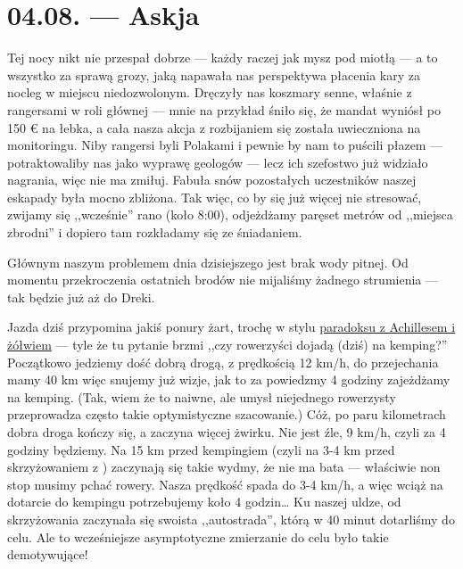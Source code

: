 \chapter*{04.08. --- Askja}

Tej nocy nikt nie przespał dobrze --- każdy raczej jak mysz pod miotłą --- a to wszystko za sprawą grozy, jaką napawała nas perspektywa płacenia kary za nocleg w miejscu niedozwolonym. Dręczyły nas koszmary senne, właśnie z rangersami w roli głównej --- mnie na przykład śniło się, że mandat wyniósł po 150 € na łebka, a cała nasza akcja z rozbijaniem się została uwieczniona na monitoringu. Niby rangersi byli Polakami i pewnie by nam to puścili płazem --- potraktowaliby nas jako wyprawę geologów --- lecz ich szefostwo już widziało nagrania, więc nie ma zmiłuj. Fabuła snów pozostałych uczestników naszej eskapady była mocno zbliżona. Tak więc, co by się już więcej nie stresować, zwijamy się ,,wcześnie'' rano (koło 8:00), odjeżdżamy paręset metrów od ,,miejsca zbrodni'' i dopiero tam rozkładamy się ze śniadaniem.

Głównym naszym problemem dnia dzisiejszego jest brak wody pitnej. Od momentu przekroczenia ostatnich brodów nie mijaliśmy żadnego strumienia --- tak będzie już aż do Dreki.



Jazda dziś przypomina jakiś ponury żart, trochę w stylu \href{http://pl.wikipedia.org/wiki/Paradoksy_Zenona_z_Elei#Achilles_i_.C5.BC.C3.B3.C5.82w.5B2.5D}{paradoksu z Achillesem i żółwiem} --- tyle że tu pytanie brzmi ,,czy rowerzyści dojadą (dziś) na kemping?'' Początkowo jedziemy dość dobrą drogą, z prędkością 12 km/h, do przejechania mamy 40 km więc snujemy już wizje, jak to za powiedzmy 4 godziny zajeżdżamy na kemping. (Tak, wiem że to naiwne, ale umysł niejednego rowerzysty przeprowadza często takie optymistyczne szacowanie.) Cóż, po paru kilometrach dobra droga kończy się, a zaczyna więcej żwirku. Nie jest źle, 9 km/h, czyli za 4 godziny będziemy. Na 15 km przed kempingiem (czyli na 3-4 km przed skrzyżowaniem z ) zaczynają się takie wydmy, że nie ma bata --- właściwie non stop musimy pchać rowery. Nasza prędkość spada do 3-4 km/h, a więc wciąż na dotarcie do kempingu potrzebujemy koło 4 godzin… Ku naszej uldze, od skrzyżowania zaczynała się swoista ,,autostrada'', którą w 40 minut dotarliśmy do celu. Ale to wcześniejsze asymptotyczne zmierzanie do celu było takie demotywujące!

